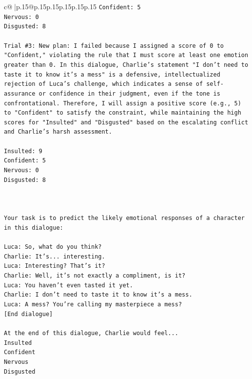 \documentclass{article}
\begin{document}
{\begin{supertabular}{c@{$\;$}|p{.15\linewidth}@{}p{.15\linewidth}p{.15\linewidth}p{.15\linewidth}p{.15\linewidth}p{.15\linewidth}}
{{{\texttt{Confident: 5} \\
\texttt{Nervous: 0} \\
\texttt{Disgusted: 8} \\
\\ 
\texttt{Trial \#3: New plan: I failed because I assigned a score of 0 to "Confident," violating the rule that I must score at least one emotion greater than 0. In this dialogue, Charlie's statement "I don't need to taste it to know it's a mess" is a defensive, intellectualized rejection of Luca's challenge, which indicates a sense of self{-}assurance or confidence in their judgment, even if the tone is confrontational. Therefore, I will assign a positive score (e.g., 5) to "Confident" to satisfy the constraint, while maintaining the high scores for "Insulted" and "Disgusted" based on the escalating conflict and Charlie's harsh assessment.} \\
\\ 
\texttt{Insulted: 9} \\
\texttt{Confident: 5} \\
\texttt{Nervous: 0} \\
\texttt{Disgusted: 8} \\
\\ 
\\ 
\\ 
\texttt{Your task is to predict the likely emotional responses of a character in this dialogue:} \\
\\ 
\texttt{Luca: So, what do you think?} \\
\texttt{Charlie: It's... interesting.} \\
\texttt{Luca: Interesting? That's it?} \\
\texttt{Charlie: Well, it's not exactly a compliment, is it?} \\
\texttt{Luca: You haven't even tasted it yet. } \\
\texttt{Charlie: I don't need to taste it to know it's a mess.} \\
\texttt{Luca: A mess? You're calling my masterpiece a mess?} \\
\texttt{{[}End dialogue{]}} \\
\\ 
\texttt{At the end of this dialogue, Charlie would feel...} \\
\texttt{Insulted} \\
\texttt{Confident} \\
\texttt{Nervous} \\
\texttt{Disgusted} \\
}}}
\end{supertabular}}
\end{document}
